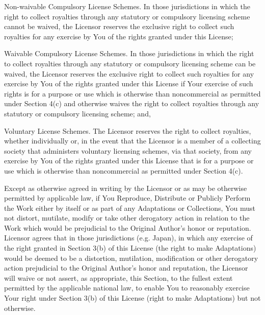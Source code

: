     \startitemize[r]
    \item
        Non-waivable Compulsory License Schemes. In those jurisdictions in
        which the right to collect royalties through any statutory or
        compulsory licensing scheme cannot be waived, the Licensor
        reserves the exclusive right to collect such royalties for any
        exercise by You of the rights granted under this License;
    \item
        Waivable Compulsory License Schemes. In those jurisdictions in
        which the right to collect royalties through any statutory or
        compulsory licensing scheme can be waived, the Licensor reserves
        the exclusive right to collect such royalties for any exercise by
        You of the rights granted under this License if Your exercise of
        such rights is for a purpose or use which is otherwise than
        noncommercial as permitted under Section 4(c) and otherwise waives
        the right to collect royalties through any statutory or compulsory
        licensing scheme; and,
    \item
        Voluntary License Schemes. The Licensor reserves the right to
        collect royalties, whether individually or, in the event that the
        Licensor is a member of a collecting society that administers
        voluntary licensing schemes, via that society, from any exercise
        by You of the rights granted under this License that is for a
        purpose or use which is otherwise than noncommercial as permitted
        under Section 4(c).
    \stopitemize

\item
    Except as otherwise agreed in writing by the Licensor or as may be
    otherwise permitted by applicable law, if You Reproduce, Distribute or
    Publicly Perform the Work either by itself or as part of any
    Adaptations or Collections, You must not distort, mutilate, modify or
    take other derogatory action in relation to the Work which would be
    prejudicial to the Original Author's honor or reputation. Licensor
    agrees that in those jurisdictions (e.g. Japan), in which any exercise
    of the right granted in Section 3(b) of this License (the right to
    make Adaptations) would be deemed to be a distortion, mutilation,
    modification or other derogatory action prejudicial to the Original
    Author's honor and reputation, the Licensor will waive or not assert,
    as appropriate, this Section, to the fullest extent permitted by the
    applicable national law, to enable You to reasonably exercise Your
    right under Section 3(b) of this License (right to make Adaptations)
    but not otherwise.

